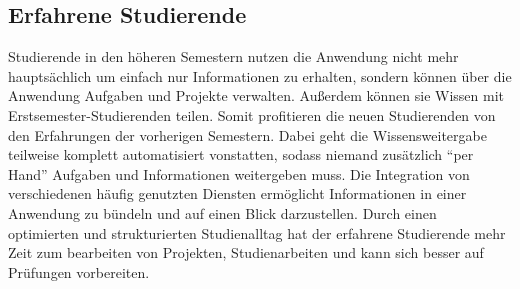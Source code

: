 \subsection{Erfahrene Studierende}
Studierende in den höheren Semestern nutzen die Anwendung nicht mehr hauptsächlich um einfach nur Informationen zu erhalten, sondern können über die Anwendung Aufgaben und Projekte verwalten. Außerdem können sie Wissen mit Erstsemester-Studierenden teilen. Somit profitieren die neuen Studierenden von den Erfahrungen  der vorherigen Semestern. Dabei geht die Wissensweitergabe teilweise komplett automatisiert vonstatten, sodass niemand zusätzlich \enquote{per Hand} Aufgaben und Informationen weitergeben muss. Die Integration von verschiedenen häufig genutzten Diensten ermöglicht Informationen in einer Anwendung zu bündeln und auf einen Blick darzustellen. Durch einen optimierten und strukturierten Studienalltag hat der erfahrene Studierende mehr Zeit zum bearbeiten von Projekten, Studienarbeiten und kann sich besser auf Prüfungen vorbereiten.